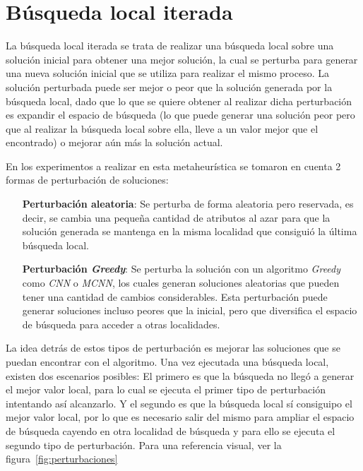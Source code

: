 \documentclass{ci5652}
\begin{document}
\section{Búsqueda local iterada}
La búsqueda local iterada se trata de realizar una búsqueda local sobre una solución inicial para obtener una mejor solución, la cual se perturba para generar una nueva solución inicial que se utiliza para realizar el mismo proceso. La solución perturbada puede ser mejor o peor que la solución generada por la búsqueda local, dado que lo que se quiere obtener al realizar dicha perturbación es expandir el espacio de búsqueda (lo que puede generar una solución peor pero que al realizar la búsqueda local sobre ella, lleve a un valor mejor que el encontrado) o mejorar aún más la solución actual.

En los experimentos a realizar en esta metaheurística se tomaron en cuenta 2 formas de perturbación de soluciones:

\begin{itemize}
\item [\textbf{Perturbación aleatoria}:] Se perturba de forma aleatoria pero reservada, es decir, se cambia una pequeña cantidad de atributos al azar para que la solución generada se mantenga en la misma localidad que consiguió la última búsqueda local.
\item [\textbf{Perturbación \textit{Greedy}}:] Se perturba la solución con un algoritmo \textit{Greedy} como \textit{CNN }o \textit{MCNN}, los cuales generan soluciones aleatorias que pueden tener una cantidad de cambios considerables. Esta perturbación puede generar soluciones incluso peores que la inicial, pero que diversifica el espacio de búsqueda para acceder a otras localidades. 
\end{itemize}

La idea detrás de estos tipos de perturbación es mejorar las soluciones que se puedan encontrar con el algoritmo. Una vez ejecutada una búsqueda local, existen dos escenarios posibles: El primero es que la búsqueda no llegó a generar el mejor valor local, para lo cual se ejecuta el primer tipo de perturbación intentando así alcanzarlo. Y el segundo es que la búsqueda local sí consiguipo el mejor valor local, por lo que es necesario salir del mismo para ampliar el espacio de búsqueda cayendo en otra localidad de búsqueda y para ello se ejecuta el segundo tipo de perturbación. Para una referencia visual, ver la figura~\ref{fig:perturbaciones}
\end{document}
